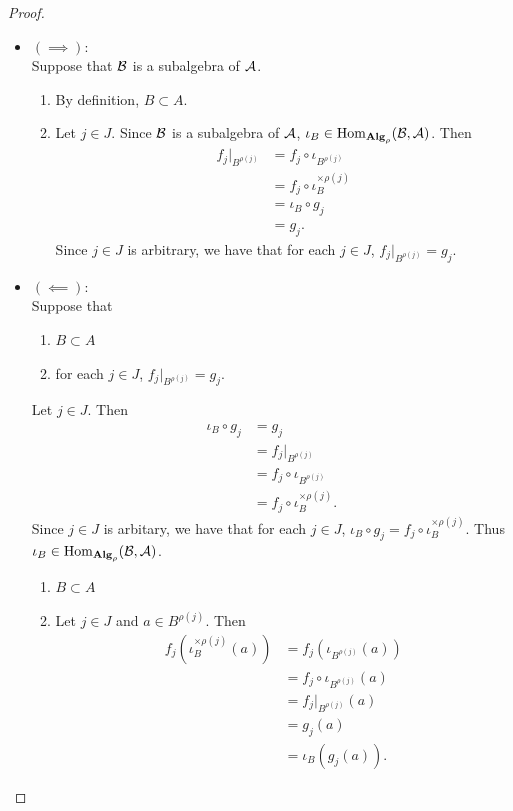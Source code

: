 \documentclass{book}
\begin{document}
	\begin{proof}\
		\begin{itemize}
			\item $(\implies)$: \\
			Suppose that $\mathcal{B}$ is a subalgebra of $\mathcal{A}$. 
			\begin{enumerate}
				\item By definition, $B \subset A$. 
				\item Let $j \in J$. Since $\mathcal{B}$ is a subalgebra of $\mathcal{A}$, $\iota_B \in \operatorname{Hom}_{\operatorname*{\text{\textbf{Alg}}}_\rho}(\mathcal{B}, \mathcal{A})$. Then 
				\begin{align*}
					f_j|_{B^{\rho(j)}}
					& = f_j \circ \iota_{B^{\rho(j)}} \\
					& = f_j \circ \iota_B^{\times \rho(j)} \\
					& = \iota_B \circ g_j \\
					& = g_j.
				\end{align*} 
				Since $j \in J$ is arbitrary, we have that for each $j \in J$, $f_j|_{B^{\rho(j)}} = g_j$.
			\end{enumerate}
			\item $(\impliedby)$: \\
			Suppose that 
			\begin{enumerate}
				\item $B \subset A$ 
				\item for each $j \in J$, $f_j|_{B^{\rho(j)}} = g_j$.
			\end{enumerate}
			Let $j \in J$. Then 
			\begin{align*}
				\iota_B \circ g_j
				& = g_j \\
				& = f_j|_{B^{\rho(j)}} \\
				& = f_j \circ \iota_{B^{\rho(j)}} \\
				& = f_j \circ \iota_B^{\times \rho(j)}.
			\end{align*} 
			Since $j \in J$ is arbitary, we have that for each $j \in J$, $\iota_B \circ g_j = f_j \circ \iota_B^{\times \rho(j)}$. Thus $\iota_B \in \operatorname{Hom}_{\operatorname*{\text{\textbf{Alg}}}_\rho}(\mathcal{B}, \mathcal{A})$. 
			\begin{enumerate}
				\item $B \subset A$
				\item Let $j \in J$ and $a \in B^{\rho(j)}$. Then 
				\begin{align*}
					f_j(\iota_B^{\times \rho(j)}(a)) 
					& = f_j(\iota_{B^{\rho(j)}}(a)) \\
					& = f_j \circ \iota_{B^{\rho(j)}} (a) \\
					& = f_j|_{B^{\rho(j)}}(a) \\
					& = g_j(a) \\
					& = \iota_B(g_j(a)).
				\end{align*} 
			\end{enumerate}
		\end{itemize}
	\end{proof}
	
\end{document}

